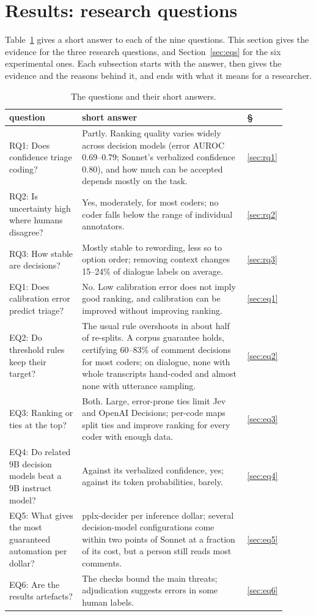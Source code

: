\section{Results: research questions}
\label{sec:results}

Table~\ref{tab:answers} gives a short answer to each of the nine questions. This section gives the evidence for the three
research questions, and Section~\ref{sec:eqs} for the six experimental ones. Each subsection starts with the answer, then
gives the evidence and the reasons behind it, and ends with what it means for a researcher.

\begin{table}[!ht]
\centering
\small
\caption{The questions and their short answers.}
\label{tab:answers}
\begin{tabular}{@{}>{\raggedright\arraybackslash}p{0.27\linewidth}>{\raggedright\arraybackslash}p{0.63\linewidth}l@{}}
\toprule
question & short answer & \S \\
\midrule
RQ1: Does confidence triage coding? & Partly. Ranking quality varies widely across decision models (error AUROC 0.69--0.79;
Sonnet's verbalized confidence 0.80), and how much can be accepted depends mostly on the task. & \ref{sec:rq1} \\
RQ2: Is uncertainty high where humans disagree? & Yes, moderately, for most coders; no coder falls below the range of
individual annotators. & \ref{sec:rq2} \\
RQ3: How stable are decisions? & Mostly stable to rewording, less so to option order; removing context changes 15--24\% of
dialogue labels on average. & \ref{sec:rq3} \\
\midrule
EQ1: Does calibration error predict triage? & No. Low calibration error does not imply good ranking, and calibration can be
improved without improving ranking. & \ref{sec:eq1} \\
EQ2: Do threshold rules keep their target? & The usual rule overshoots in about half of re-splits. A corpus guarantee holds,
certifying 60--83\% of comment decisions for most coders; on dialogue, none with whole transcripts hand-coded and almost none
with utterance sampling. & \ref{sec:eq2} \\
EQ3: Ranking or ties at the top? & Both. Large, error-prone ties limit Jev and OpenAI Decisions; per-code maps split ties and
improve ranking for every coder with enough data. & \ref{sec:eq3} \\
EQ4: Do related 9B decision models beat a 9B instruct model? & Against its verbalized confidence, yes; against its token
probabilities, barely. & \ref{sec:eq4} \\
EQ5: What gives the most guaranteed automation per dollar? & pplx-decider per inference dollar; several decision-model
configurations come within two points of Sonnet at a fraction of its cost, but a person still reads most comments. &
\ref{sec:eq5} \\
EQ6: Are the results artefacts? & The checks bound the main threats; adjudication suggests errors in some human labels. &
\ref{sec:eq6} \\
\bottomrule
\end{tabular}
\end{table}

